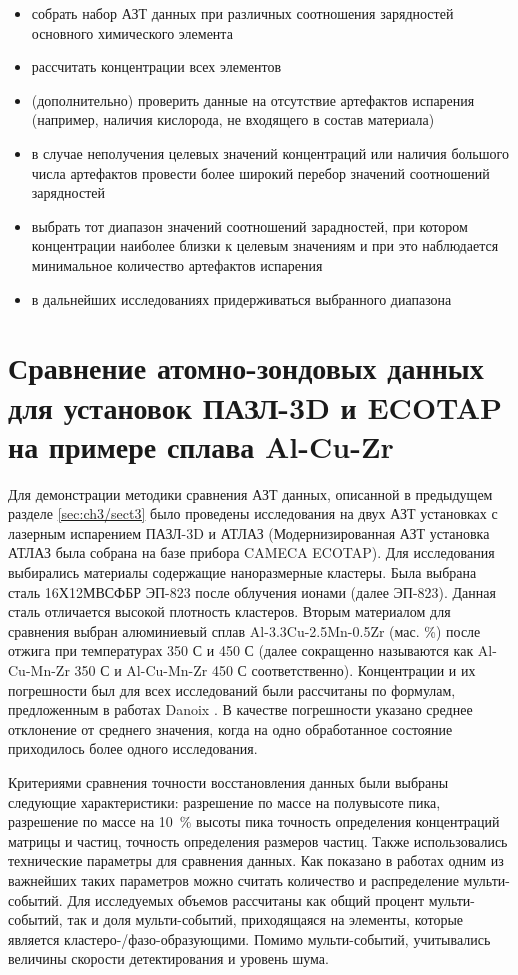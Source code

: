 \begin{itemize}
	\item собрать набор АЗТ данных при различных соотношения зарядностей основного химического элемента 
	\item рассчитать концентрации всех элементов	
	\item (дополнительно) проверить данные на отсутствие артефактов испарения (например, наличия кислорода, не входящего в состав материала)
	\item в случае неполучения целевых значений концентраций или наличия большого числа артефактов провести более широкий перебор значений соотношений зарядностей
	\item выбрать тот диапазон значений соотношений зарадностей, при котором концентрации наиболее близки к целевым значениям и при это наблюдается минимальное количество артефактов испарения
	\item в дальнейших исследованиях придерживаться выбранного диапазона
\end{itemize}

\FloatBarrier

\section{Сравнение атомно-зондовых данных для установок ПАЗЛ-3D и ECOTAP на примере сплава Al-Cu-Zr}\label{sec:ch3/sect4}

Для демонстрации методики сравнения АЗТ данных, описанной в предыдущем разделе \cref{sec:ch3/sect3} было проведены исследования на двух АЗТ установках с лазерным испарением ПАЗЛ-3D и АТЛАЗ (Модернизированная АЗТ установка АТЛАЗ была собрана на базе прибора CAMECA ECOTAP). Для исследования выбирались материалы содержащие наноразмерные кластеры. Была выбрана сталь 16Х12МВСФБР ЭП-823 \cite{Porollo04} после облучения ионами (далее ЭП-823). Данная сталь отличается высокой плотность кластеров. Вторым материалом для сравнения выбран алюминиевый сплав Al-3.3Cu-2.5Mn-0.5Zr (мас. \%) после отжига при температурах 350 \textdegree С и 450 \textdegree С \cite{Belov22,Belov21} (далее сокращенно называются как Al-Cu-Mn-Zr 350 \textdegree С и Al-Cu-Mn-Zr 450 \textdegree С соответственно). Концентрации и их погрешности был для всех исследований были рассчитаны по формулам, предложенным в работах Danoix \cite{Danoix071,Danoix072}. В качестве погрешности указано среднее отклонение от среднего значения, когда на одно обработанное состояние приходилось более одного исследования.

Критериями сравнения точности восстановления данных были выбраны следующие характеристики: разрешение по массе на полувысоте пика, разрешение по массе на 10~\% высоты пика точность определения концентраций матрицы и частиц, точность определения размеров частиц. Также использовались технические параметры для сравнения данных. Как показано в работах \cite{Tang10,Geuser07} одним из важнейших таких параметров можно считать количество и распределение мульти-событий. Для исследуемых объемов рассчитаны как общий процент мульти-событий, так и доля мульти-событий, приходящаяся на элементы, которые является кластеро-/фазо-образующими. Помимо мульти-событий, учитывались величины скорости детектирования и уровень шума.

